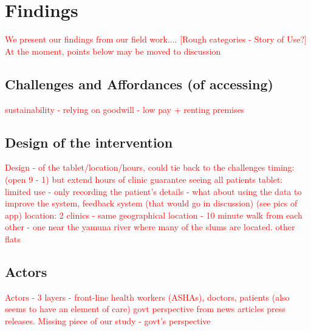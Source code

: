 \section{Findings}
\begin{comment}
This will form the chunk of your writing. I have sometimes iterated through these in written form, or else made a rough outline  on paper and then put it down. It is best that we talk about this section before you attempt to write. Depending on the structure of this section, you might label the section Findings or Analysis. The thing to remember is that all of your data goes into this section, and you need to weave a story around your data that is compelling, novel, and forms the central theme of the paper. If you have done qualitative work, make sure you include these quotes in the findings. Most importantly, do not tell a story based on quotes you have. Pick quotes based on the story you want to tell.

STORY OF USE
\end{comment}
\textcolor{red}{We present our findings from our field work.... [Rough categories - Story of Use?] At the moment, points below may be moved to discussion}

\subsection{Challenges and Affordances (of accessing)}
\textcolor{red}{sustainability - relying on goodwill - low pay + renting premises}

\subsection{Design of the intervention}
\textcolor{red}{Design - of the tablet/location/hours, could tie back to the challenges
timing: (open 9 - 1) but extend hours of clinic
guarantee seeing all patients
tablet: limited use - only recording the patient's details - what about using the data to improve the system, feedback system (that would go in discussion) (see pics of app)
location: 2 clinics - same geographical location - 10 minute walk from each other - one near the yamuna river where many of the slums are located. other flats}

\subsection{Actors}
\textcolor{red}{
Actors - 3 layers - front-line health workers (ASHAs), doctors, patients (also seems to have an element of care)
govt perspective from news articles press releases. Missing piece of our study - govt's perspective}

